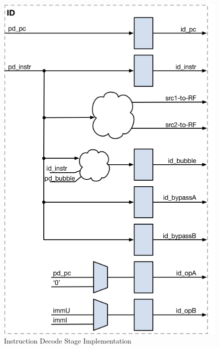 \begin{figure}[h]
  \includegraphics{assets/img/Pipeline-ID}
  \caption{Instruction Decode Stage Implementation}
\end{figure}

